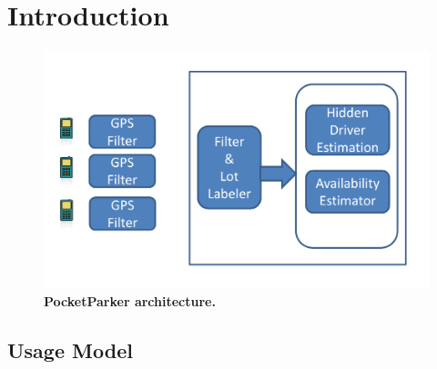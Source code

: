 \section{Introduction}

\begin{figure}
\centering
\includegraphics[width=\columnwidth]{./figures/blockdiagram.pdf}

\caption{\textbf{PocketParker architecture.}}

\label{fig-arch}
\end{figure}

\subsection{Usage Model}
